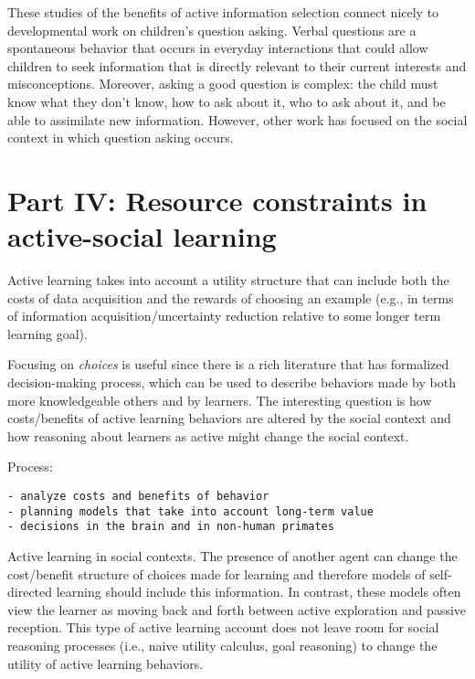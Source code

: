 \documentclass[a4paper,man,apacite,floatsintext]{apa6}
\begin{document}
These studies of the benefits of active information selection connect
nicely to developmental work on children's question asking. Verbal
questions are a spontaneous behavior that occurs in everyday
interactions that could allow children to seek information that is
directly relevant to their current interests and misconceptions.
Moreover, asking a good question is complex: the child must know what
they don't know, how to ask about it, who to ask about it, and be able
to assimilate new information. However, other work has focused on the
social context in which question asking occurs.

\section{Part IV: Resource constraints in active-social
learning}\label{part-iv-resource-constraints-in-active-social-learning}

Active learning takes into account a utility structure that can include
both the costs of data acquisition and the rewards of choosing an
example (e.g., in terms of information acquisition/uncertainty reduction
relative to some longer term learning goal).

Focusing on \emph{choices} is useful since there is a rich literature
that has formalized decision-making process, which can be used to
describe behaviors made by both more knowledgeable others and by
learners. The interesting question is how costs/benefits of active
learning behaviors are altered by the social context and how reasoning
about learners as active might change the social context.

Process:

\begin{verbatim}
- analyze costs and benefits of behavior
- planning models that take into account long-term value
- decisions in the brain and in non-human primates 
\end{verbatim}

Active learning in social contexts. The presence of another agent can
change the cost/benefit structure of choices made for learning and
therefore models of self-directed learning should include this
information. In contrast, these models often view the learner as moving
back and forth between active exploration and passive reception. This
type of active learning account does not leave room for social reasoning
processes (i.e., naive utility calculus, goal reasoning) to change the
utility of active learning behaviors.
\end{document}
